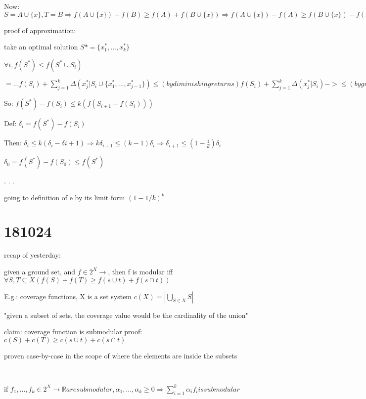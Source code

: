 \documentclass{report}
\begin{document}
	Now: $S=A\cup\{x\}, T=B \Rightarrow f(A\cup\{x\})+f(B)\geq f(A)+f(B\cup\{x\}) \Rightarrow f(A\cup\{x\})-f(A)\geq f(B\cup\{x\})-f(B) \Rightarrow \Delta(x|A) \geq \Delta(x|B)$
	
	proof of approximation:
	
	take an optimal solution $S*=\{x_1^*, ..., x_k^*\}$
	
	$\forall i, f(S^*) \leq f(S^* \cup S_i)$ %
	
	$ = ... f(S_i) + \sum_{j=1}^{k}\Delta(x_j^*|S_i\cup \{x_1^*, ..., x_{j-1}^*\}) \leq (bydiminishingreturns) f(S_i) + \sum_{j=1}^{k}\Delta(x_j^*|S_i) -> \leq (bygreediness) f(S_i) + \sum_{j=1}^{k}\Delta(x_{i+1}|S_i) = f(S_i) + k(f(S_i \cup \{x_{i+1}\})-f(S_i)) = kf(S_{i+1}) - (k-1)f(S_i)$
	
	
	So: $f(S^*) - f(S_i) \leq k(f(S_{i+1} - f(S_i)))$
	
	Def: $\delta_i = f(S^*) - f(S_i)$
	
	Then: $\delta_i \leq k(\delta_i - \delta{i+1}) \Rightarrow k\delta_{i+1} \leq (k-1)\delta_i \Rightarrow \delta_{i+1} \leq (1-\frac{1}{k})\delta_i$
	
	$\delta_0 = f(S^*)-f(S_0) \leq f(S^*)$ %
	
	
	.
	.
	.
	
	going to definition of e by its limit form $(1-1/k)^k$
	
	
	\section{181024}
	
	recap of yesterday:
	
	given a ground set, and $f \in 2^X \to \mathbb{}$, then f is modular iff $\forall S, T \subseteq X (f(S)+f(T) \geq f(s\cup t) + f(s \cap t))$
	
	E.g.: coverage functions, X is a set system $c(X) = \left| \bigcup_{S \in X} S \right|$

	"given a subset of sets, the coverage value would be the cardinality of the union"
	
	claim: coverage function is submodular
	proof: $c(S)+c(T) \geq c(s\cup t) + c(s \cap t)$
	
	proven case-by-case in the scope of where the elements are inside the subsets
	
	\
	
	if $f_1, ..., f_k \in 2^X \to \mathbb{R} are submodular, \alpha_1, ..., \alpha_k \geq 0 \Rightarrow \sum_{i=1}^{k}\alpha_i f_i is submodular$
	
\end{document}
